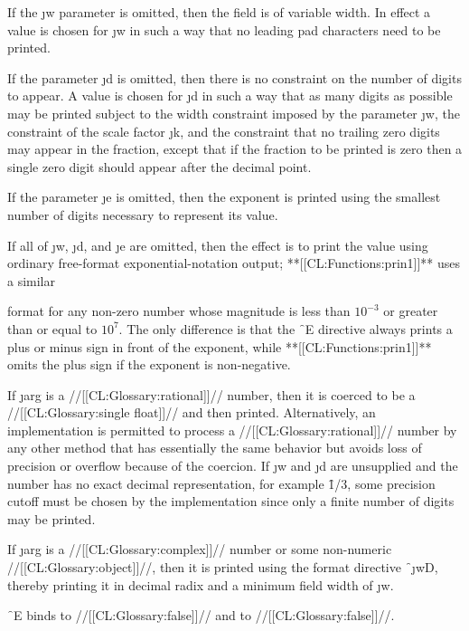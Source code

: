 If the \j{w} parameter is omitted, then the field is of variable width. In effect a value is chosen for \j{w} in such a way that no leading pad characters need to be printed.

If the parameter \j{d} is omitted, then there is no constraint on the number of digits to appear. A value is chosen for \j{d} in such a way that as many digits as possible may be printed subject to the width constraint imposed by the parameter \j{w}, the constraint of the scale factor \j{k}, and the constraint that no trailing zero digits may appear in the fraction, except that if the fraction to be printed is zero then a single zero digit should appear after the decimal point.

If the parameter \j{e} is omitted, then the exponent is printed using the smallest number of digits necessary to represent its value.

If all of \j{w}, \j{d}, and \j{e} are omitted, then the effect is to print the value using ordinary free-format exponential-notation output; **[[CL:Functions:prin1]]** uses   a similar

format for any non-zero number whose magnitude is less than $10^{-3}$ or greater than or equal to $10^7$.  The only difference is that the \f{~E}  directive always prints a plus or minus sign in front of the
    exponent, while **[[CL:Functions:prin1]]** omits the plus sign if the exponent is
    non-negative.

If \j{arg} is a //[[CL:Glossary:rational]]//  number, then it is coerced to be a //[[CL:Glossary:single float]]// and then printed.  Alternatively, an implementation is permitted to process a //[[CL:Glossary:rational]]//  number by any other method that has essentially the same behavior but avoids loss of precision or overflow because of the coercion.  If \j{w} and \j{d} are unsupplied and the number has no exact decimal representation, for example \f{1/3}, some precision cutoff must be chosen by the implementation since only a finite number of digits may be printed.

If \j{arg} is a //[[CL:Glossary:complex]]// number or some non-numeric //[[CL:Glossary:object]]//,  then it is printed using the format directive \f{~\j{w}D}, thereby printing it in decimal radix and a minimum field width of \j{w}.

 \f{~E} binds
      to //[[CL:Glossary:false]]// 
 and  to //[[CL:Glossary:false]]//.

